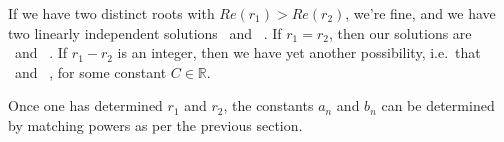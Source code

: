 \documentclass[12pt]{book}
\begin{document}
If we have two distinct roots with $Re(r_1) > Re(r_2)$, we're fine, and we
have two linearly independent solutions
\be
{}
\quad\mbox{  and  }\quad
{}.
\ee
If $r_1=r_2$, then our solutions are
\be
{}
\quad\mbox{  and  }\quad
{}.
\ee
If $r_1-r_2$ is an integer, then we have yet another possibility, i.e.\ that
\be
{}
\quad\mbox{  and  }\quad
{},
\ee
for some constant $C\in\mathbb{R}$.

Once one has determined $r_1$ and $r_2$, the constants $a_n$ and $b_n$ can
be determined by matching powers as per the previous section.
\end{document}
